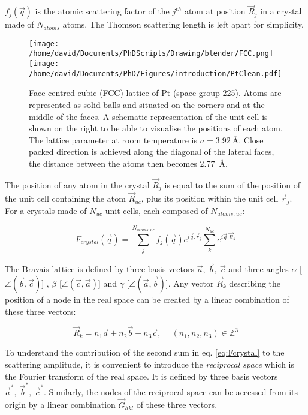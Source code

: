 $f_j(\vec{q})$ is the atomic scattering factor of the $j^{th}$ atom at position $\vec{R}_j$ in a crystal made of $N_{atoms}$ atoms.
The Thomson scattering length is left apart for simplicity.

\begin{figure}[!htb]
    \centering
    \texttt{[image: /home/david/Documents/PhDScripts/Drawing/blender/FCC.png]}
    \texttt{[image: /home/david/Documents/PhD/Figures/introduction/PtClean.pdf]}
    \caption{
    Face centred cubic (FCC) lattice of Pt (space group 225).
    Atoms are represented as solid balls and situated on the corners and at the middle of the faces.
    A schematic representation of the unit cell is shown on the right to be able to visualise the positions of each atom.
    The lattice parameter at room temperature is $a = \qty{3.92}{\angstrom}$.
    Close packed direction is achieved along the diagonal of the lateral faces, the distance between the atoms then becomes \qty{2.77}{\angstrom}.
    }
    \label{fig:fcc}
\end{figure}

The position of any atom in the crystal $\vec{R}_j$ is equal to the sum of the position of the unit cell containing the atom $\vec{R}_{uc}$, plus its position within the unit cell $\vec{r}_j$.
For a crystals made of $N_{uc}$ unit cells, each composed of $N_{atoms,uc}$:

\begin{equation}
    F_{crystal}(\vec{q}) = \sum_j^{N_{atoms,uc}} f_j(\vec{q}) e^{i\vec{q}.\vec{r}_j} \sum_k^{N_{uc}} e^{i\vec{q}.\vec{R}_k}
    \label{eq:Fcrystal}
\end{equation}

The Bravais lattice is defined by three basis vectors $\vec{a},\ \vec{b},\ \vec{c}$ and three angles $\alpha$ [$\angle (\vec{b}, \vec{c})$] , $\beta$ [$\angle (\vec{c}, \vec{a})$] and $\gamma$ [$\angle (\vec{a}, \vec{b})$].
Any vector $\vec{R}_k$ describing the position of a node in the real space can be created by a linear combination of these three vectors:

\begin{equation}
    \label{eq:R_k}
    \vec{R}_k=n_1\vec{a} + n_2\vec{b} + n_3\vec{c}, \quad \ (n_1,n_2,n_3) \in \mathbb{Z}^3
\end{equation}

To understand the contribution of the second sum in eq. \ref{eq:Fcrystal} to the scattering amplitude, it is convenient to introduce the \textit{reciprocal space} which is the Fourier transform of the real space.
It is defined by three basis vectors $\vec{a}^*,\ \vec{b}^*,\ \vec{c}^*$.
Similarly, the nodes of the reciprocal space can be accessed from its origin by a linear combination $\vec{G}_{hkl}$ of these three vectors.


